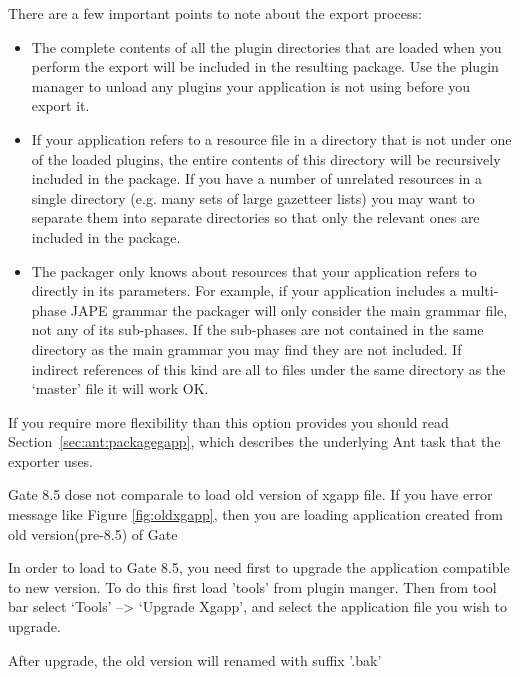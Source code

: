 There are a few important points to note about the export process:
\begin{itemize}
\item The complete contents of all the plugin directories that are loaded when
  you perform the export will be included in the resulting package.  Use the
  plugin manager to unload any plugins your application is not using before you
  export it.
\item If your application refers to a resource file in a directory that is not
  under one of the loaded plugins, the entire contents of this directory will be
  recursively included in the package.  If you have a number of unrelated
  resources in a single directory (e.g. many sets of large gazetteer lists) you
  may want to separate them into separate directories so that only the relevant
  ones are included in the package.
\item The packager only knows about resources that your application refers to
  directly in its parameters.  For example, if your application includes a
  multi-phase JAPE grammar the packager will only consider the main grammar
  file, not any of its sub-phases.  If the sub-phases are not contained in the
  same directory as the main grammar you may find they are not included.  If
  indirect references of this kind are all to files under the same directory as
  the `master' file it will work OK.
\end{itemize}

If you require more flexibility than this option provides you should read
Section~\ref{sec:ant:packagegapp}, which describes the underlying Ant task that
the exporter uses.

Gate 8.5 dose not comparale to load old version of xgapp file. If you have error message
like Figure \ref{fig:oldxgapp}, then you are loading application created from old version(pre-8.5) of Gate

In order to load to Gate 8.5, you need first to upgrade the application compatible to new version. To do this first load 
'tools' from plugin manger. Then from tool bar select `Tools' --> `Upgrade Xgapp', and select the application file you wish to upgrade.

After upgrade, the old version will renamed with suffix  '.bak'


